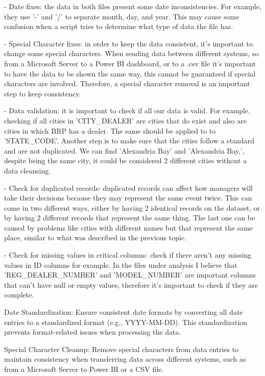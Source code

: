 \documentclass[a4paper, 12pt]{article}
\begin{document}
- Date fixes: the data in both files present some date inconsistencies. For example, they use '-' and '/' to separate month, day, and year. This may cause some confusion when a script tries to determine what type of data the file has.

- Special Character fixes: in order to keep the data consistent, it's important to change some special characters. When sending data between different systems, so from a Microsoft Server to a Power BI dashboard, or to a .csv file it's important to have the data to be shown the same way, this cannot be guaranteed if special characters are involved. Therefore, a special character removal is an important step to keep consistency.

- Data validation: it is important to check if all our data is valid. For example, checking if all cities in 'CITY\_DEALER' are cities that do exist and also are cities in which BRP has a dealer. The same should be applied to to 'STATE\_CODE'. Another step is to make sure that the cities follow a standard and are not duplicated. We can find 'Alexandria Bay' and 'Alexandria Bay,', despite being the same city, it could be considered 2 different cities without a data cleansing.

- Check for duplicated records: duplicated records can affect how managers will take their decisions because they may represent the same event twice. This can come in two different ways, either by having 2 identical records on the dataset, or by having 2 different records that represent the same thing. The last one can be caused by problems like cities with different names but that represent the same place, similar to what was described in the previous topic.

- Check for missing values in critical columns: check if there aren't any missing values in ID columns for example. In the files under analysis I believe that 'REG\_DEALER\_NUMBER' and 'MODEL\_NUMBER' are important columns that can't have null or empty values, therefore it's important to check if they are complete.

Date Standardization: Ensure consistent date formats by converting all date entries to a standardized format (e.g., YYYY-MM-DD). This standardization prevents format-related issues when processing the data.

Special Character Cleanup: Remove special characters from data entries to maintain consistency when transferring data across different systems, such as from a Microsoft Server to Power BI or a CSV file.
\end{document}
